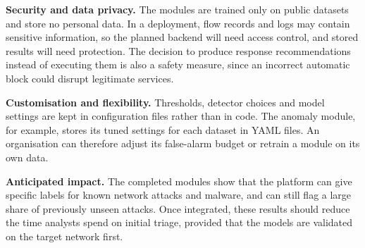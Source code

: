 \textbf{Security and data privacy.} The modules are trained only on public datasets and store no personal data. In a deployment, flow records and logs may contain sensitive information, so the planned backend will need access control, and stored results will need protection. The decision to produce response recommendations instead of executing them is also a safety measure, since an incorrect automatic block could disrupt legitimate services.

\textbf{Customisation and flexibility.} Thresholds, detector choices and model settings are kept in configuration files rather than in code. The anomaly module, for example, stores its tuned settings for each dataset in YAML files. An organisation can therefore adjust its false-alarm budget or retrain a module on its own data.

\textbf{Anticipated impact.} The completed modules show that the platform can give specific labels for known network attacks and malware, and can still flag a large share of previously unseen attacks. Once integrated, these results should reduce the time analysts spend on initial triage, provided that the models are validated on the target network first.
